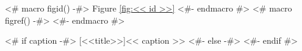 <# macro figid() -#>
Figure \ref{fig:<< id >>}
<#- endmacro #>
<# macro figref() -#>
\color{light-gray}
<#- endmacro #>

\begin{samepage}
<# if caption -#>
[<<title>>]{<< caption >>}
<#- else -#>
<#- endif #>\label{fig:<< id >>}
\end{samepage}
\pagebreak

